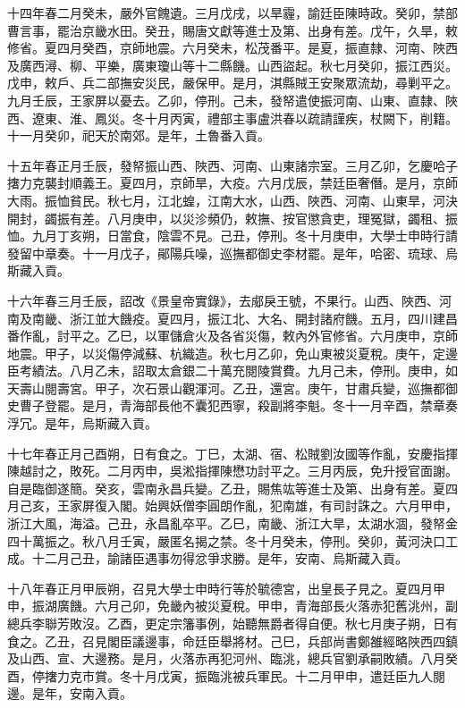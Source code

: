 \begin{pinyinscope}
十四年春二月癸未，嚴外官餽遺。三月戊戌，以旱霾，諭廷臣陳時政。癸卯，禁部曹言事，罷治京畿水田。癸丑，賜唐文獻等進士及第、出身有差。戊午，久旱，敕修省。夏四月癸酉，京師地震。六月癸未，松茂番平。是夏，振直隸、河南、陜西及廣西潯、柳、平樂，廣東瓊山等十二縣饑。山西盜起。秋七月癸卯，振江西災。戊申，敕戶、兵二部撫安災民，嚴保甲。是月，淇縣賊王安聚眾流劫，尋剿平之。九月壬辰，王家屏以憂去。乙卯，停刑。己未，發帑遣使振河南、山東、直隸、陜西、遼東、淮、鳳災。冬十月丙寅，禮部主事盧洪春以疏請謹疾，杖闕下，削籍。十一月癸卯，祀天於南郊。是年，土魯番入貢。

十五年春正月壬辰，發帑振山西、陜西、河南、山東諸宗室。三月乙卯，乞慶哈子撦力克襲封順義王。夏四月，京師旱，大疫。六月戊辰，禁廷臣奢僭。是月，京師大雨。振恤貧民。秋七月，江北蝗，江南大水，山西、陜西、河南、山東旱，河決開封，蠲振有差。八月庚申，以災沴頻仍，敕撫、按官懲貪吏，理冤獄，蠲租、振恤。九月丁亥朔，日當食，陰雲不見。己丑，停刑。冬十月庚申，大學士申時行請發留中章奏。十一月戊子，鄖陽兵噪，巡撫都御史李材罷。是年，哈密、琉球、烏斯藏入貢。

十六年春三月壬辰，詔改《景皇帝實錄》，去郕戾王號，不果行。山西、陜西、河南及南畿、浙江並大饑疫。夏四月，振江北、大名、開封諸府饑。五月，四川建昌番作亂，討平之。乙巳，以軍儲倉火及各省災傷，敕內外官修省。六月庚申，京師地震。甲子，以災傷停減蘇、杭織造。秋七月乙卯，免山東被災夏稅。庚午，定邊臣考績法。八月乙未，詔取太倉銀二十萬充閱陵賞費。九月己未，停刑。庚申，如天壽山閱壽宮。甲子，次石景山觀渾河。乙丑，還宮。庚午，甘肅兵變，巡撫都御史曹子登罷。是月，青海部長他不囊犯西寧，殺副將李魁。冬十一月辛酉，禁章奏浮冗。是年，烏斯藏入貢。

十七年春正月己酉朔，日有食之。丁巳，太湖、宿、松賊劉汝國等作亂，安慶指揮陳越討之，敗死。二月丙申，吳淞指揮陳懋功討平之。三月丙辰，免升授官面謝。自是臨御遂簡。癸亥，雲南永昌兵變。乙丑，賜焦竑等進士及第、出身有差。夏四月己亥，王家屏復入閣。始興妖僧李圓朗作亂，犯南雄，有司討誅之。六月甲申，浙江大風，海溢。己丑，永昌亂卒平。乙巳，南畿、浙江大旱，太湖水涸，發帑金四十萬振之。秋八月壬寅，嚴匿名揭之禁。冬十月癸未，停刑。癸卯，黃河決口工成。十二月己丑，諭諸臣遇事勿得忿爭求勝。是年，安南、烏斯藏入貢。

十八年春正月甲辰朔，召見大學士申時行等於毓德宮，出皇長子見之。夏四月甲申，振湖廣饑。六月己卯，免畿內被災夏稅。甲申，青海部長火落赤犯舊洮州，副總兵李聯芳敗沒。乙酉，更定宗籓事例，始聽無爵者得自便。秋七月庚子朔，日有食之。乙丑，召見閣臣議邊事，命廷臣舉將材。己巳，兵部尚書鄭雒經略陜西四鎮及山西、宣、大邊務。是月，火落赤再犯河州、臨洮，總兵官劉承嗣敗績。八月癸酉，停撦力克市賞。冬十月戊寅，振臨洮被兵軍民。十二月甲申，遣廷臣九人閱邊。是年，安南入貢。


\end{pinyinscope}
